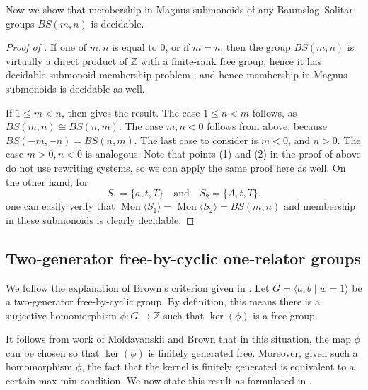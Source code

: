 \documentclass[11pt]{amsart}
\newcommand{\Mgen}[1]{\operatorname{Mon}\bigl\langle #1 \bigr\rangle}
\newcommand{\Z}{\mathbb{Z}}
\theoremstyle{plain}
\theoremstyle{definition}
\begin{document}
Now we show that membership in Magnus submonoids of any Baumslag--Solitar groups $BS(m,n)$ is decidable.

  
\begin{proof}[Proof of ]


If one of $m, n$ is equal to $0$, or if $m=n$, then the group $BS(m, n)$ is virtually a direct product of $\Z$ with a finite-rank free group, hence it has decidable 
submonoid membership problem 
\cite[Theorem 1]{lohrey2008submonoid}, and hence membership in Magnus submonoids is decidable as well. 

If $1 \leq m < n$, then  gives the result. 
The case $1 \leq n < m$ follows, as $BS(m, n) \cong BS(n, m)$.
The case $m, n < 0$ follows from above, because $BS(-m, -n) = BS(n, m)$. 
The last case to consider is $m < 0$, and $n > 0$. The case $m > 0, n < 0$ is analogous. 
Note that points (1) and (2) in the proof of  above do not use rewriting systems, so we can apply the same proof here as well. On the other hand, for     
	\[
    S_1 = \{a, t, T\} \quad \text{and} \quad S_2 = \{A, t, T\}.
    \]
one can easily verify that $\Mgen{S_1} = \Mgen{S_2} = BS(m, n)$ and membership in these submonoids is clearly decidable. 
\end{proof}




\subsection{Two-generator free-by-cyclic one-relator groups}\label{Two-generator free-by-cyclic one-relator groups}

We follow the explanation of Brown's criterion given in \cite[Section~5]{dunfield2006random}.
Let 
$
G = \langle a, b \mid w = 1 \rangle
$
be a two-generator free-by-cyclic group. By definition, this means there is a surjective homomorphism 
$
\phi: G \to \mathbb{Z}
$
such that $\ker(\phi)$ is a free group.

It follows from work of Moldavanskii \cite{Moldavanskii1967} and Brown \cite{Brown1987}
that in this situation, the map $\phi$ can be chosen so that $\ker(\phi)$ is finitely generated free. Moreover, given such a homomorphism $\phi$, the fact that the kernel is finitely generated is equivalent to a certain max-min condition. 
We now state this result as formulated in \cite[Theorem 5.1]{dunfield2006random}.
\end{document}
